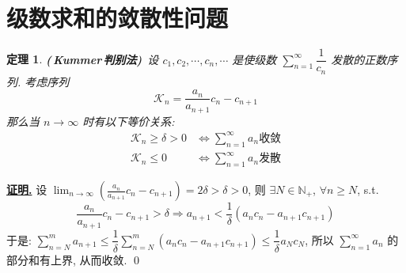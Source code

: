 \documentclass[10pt,a4paper]{book}
\theoremstyle{thmstyle} %
\newtheorem{theorem}{定理}[chapter]
\theoremstyle{defstyle} %
\theoremstyle{prostyle} %
\renewenvironment{proof}[1][证明]{\par{\kaishu \uline{\textbf{#1.}}} \;\fangsong}{\qed\par}
\begin{document}
	\section{级数求和的敛散性问题}
	\begin{theorem}
		\textbf{(\,Kummer\,判别法)}\ 设 $c_1,c_2,\cdots,c_n,\cdots$ 是使级数 $\displaystyle\sum_{n=1}^{\infty}\dfrac{1}{c_n}$ 发散的正数序列. 考虑序列
$$
\mathcal{K} _n=\frac{a_n}{a_{n+1}}c_n-c_{n+1}
$$
		那么当 $n\rightarrow\infty$ 时有以下等价关系:
		\begin{align*}
			\mathcal{K} _n\geqslant \delta >0&\Longleftrightarrow \sum_{n=1}^{\infty}{a_n}\text{收敛}
			\\
			\mathcal{K} _n\leqslant 0&\Longleftrightarrow \sum_{n=1}^{\infty}{a_n}\text{发散}
		\end{align*}
	\end{theorem}
	\begin{proof}
		设 $\displaystyle\lim_{n\rightarrow\infty}\left(\frac{a_n}{a_{n+1}}c_n-c_{n+1} \right)=2\delta>\delta>0$, 则 $\exists N\in\mathbb{N_+}$, $\forall n\geqslant N$, s.t.
		$$
		\frac{a_n}{a_{n+1}}c_n-c_{n+1}>\delta \Longrightarrow a_{n+1}<\frac{1}{\delta}\left( a_nc_n-a_{n+1}c_{n+1} \right) 
		$$
		于是: $\displaystyle\sum_{n=N}^{m}a_{n+1}\leqslant\dfrac{1}{\delta}\displaystyle\sum_{n=N}^{m}\left(a_nc_n-a_{n+1}c_{n+1} \right)\leqslant\dfrac{1}{\delta}a_Nc_N$, 所以 $\displaystyle\sum_{n=1}^{\infty}a_n$ 的部分和有上界, 从而收敛.
	\end{proof}
\end{document}
